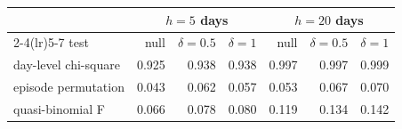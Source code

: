 \begin{tabular}{lrrrrrr}\toprule
 & \multicolumn{3}{c}{$h=5$ days} & \multicolumn{3}{c}{$h=20$ days}\\
\cmidrule(lr){2-4}\cmidrule(lr){5-7} test & null & $\delta=0.5$ & $\delta=1$ & null & $\delta=0.5$ & $\delta=1$\\\midrule
day-level chi-square & 0.925 & 0.938 & 0.938 & 0.997 & 0.997 & 0.999\\
episode permutation & 0.043 & 0.062 & 0.057 & 0.053 & 0.067 & 0.070\\
quasi-binomial F & 0.066 & 0.078 & 0.080 & 0.119 & 0.134 & 0.142\\
\bottomrule\end{tabular}
